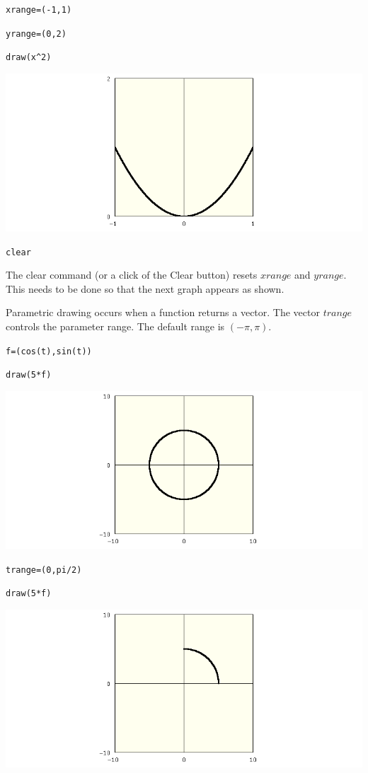 \documentclass[11pt]{article}
\begin{document}
\verb$xrange=(-1,1)$

\verb$yrange=(0,2)$

\verb$draw(x^2)$

\medskip
\begin{center}
\includegraphics[scale=0.4]{parabola2.png}
\end{center}

\verb$clear$

\medskip
\noindent
The clear command (or a click of the Clear button)
resets $xrange$ and $yrange$.
This needs to be done so that the next graph
appears as shown.

\newpage

\noindent
Parametric drawing occurs when a function returns a vector.
The vector $trange$ controls the parameter range.
The default range is $(-\pi,\pi)$.

\medskip
\verb$f=(cos(t),sin(t))$

\verb$draw(5*f)$

\medskip
\begin{center}
\includegraphics[scale=0.4]{circle.png}
\end{center}

\verb$trange=(0,pi/2)$

\verb$draw(5*f)$

\medskip
\begin{center}
\includegraphics[scale=0.4]{circle2.png}
\end{center}
\end{document}
